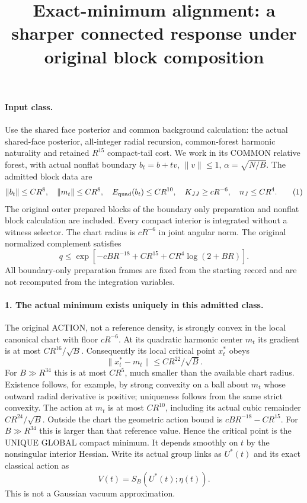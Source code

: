 \documentclass[11pt]{article}
\title{Exact-minimum alignment: a sharper connected response under original block composition}\author{}\date{}
\begin{document}
\maketitle
\paragraph{Input class.}
Use the shared face posterior and common background calculation: the actual shared-face posterior, all-integer radial recursion,
common-forest harmonic naturality and retained $R^{15}$ compact-tail cost.
We work in its COMMON relative forest, with actual nonflat boundary $b_t=b+tv$,
$\|v\|\le1$, $\alpha=\sqrt{N/B}$. The admitted block data are
\[
 \|b_t\|\le CR^8,\quad \|m_t\|\le CR^8,\quad E_{\rm quad}(b_t)\le CR^{10},
 \quad K_{JJ}\ge cR^{-6},\quad n_J\le CR^4.                              \tag{1}
\]
The original outer prepared blocks of the boundary only preparation and nonflat block calculation are included. Every compact
interior is integrated without a witness selector. The chart radius is
$cR^{-6}$ in joint angular norm. The original normalized complement satisfies
\[
 q\le\exp[-cBR^{-18}+CR^{15}+CR^4\log(2+BR)].                            \tag{2}
\]
All boundary-only preparation frames are fixed from the starting record and
are not recomputed from the integration variables.

\paragraph{1. The actual minimum exists uniquely in this admitted class.}
The original ACTION, not a reference density, is strongly convex in the local
canonical chart with floor $cR^{-6}$. At its quadratic harmonic center $m_t$
its gradient is at most $CR^{16}/\sqrt B$. Consequently its local critical
point $x_t^*$ obeys
\[
 \|x_t^*-m_t\|\le CR^{22}/\sqrt B.                                     \tag{3}
\]
For $B\gg R^{34}$ this is at most $CR^5$, much smaller than the available
chart radius. Existence follows, for example, by strong convexity on a ball
about $m_t$ whose outward radial derivative is positive; uniqueness follows
from the same strict convexity.
The action at $m_t$ is at most $CR^{10}$, including its actual cubic remainder
$CR^{24}/\sqrt B$. Outside the chart the geometric action bound is
$cBR^{-18}-CR^{15}$. For $B\gg R^{34}$ this is larger than that reference
value. Hence the critical point is the UNIQUE GLOBAL compact minimum.
It depends smoothly on $t$ by the nonsingular interior Hessian. Write its
actual group links as $U^*(t)$ and its exact classical action as
\[
 V(t)=S_B(U^*(t);\eta(t)).                                               \tag{4}
\]
This is not a Gaussian vacuum approximation.
\end{document}
